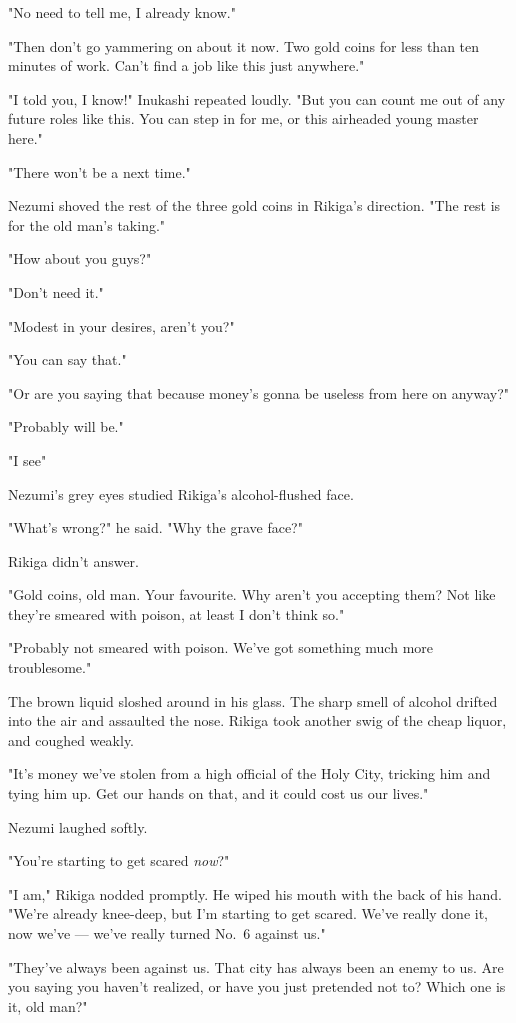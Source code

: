 "No need to tell me, I already know."

"Then don't go yammering on about it now. Two gold coins for less than
ten minutes of work. Can't find a job like this just anywhere."

"I told you, I know!" Inukashi repeated loudly. "But you can count me
out of any future roles like this. You can step in for me, or this
airheaded young master here."

"There won't be a next time."

Nezumi shoved the rest of the three gold coins in Rikiga's direction.
"The rest is for the old man's taking."

"How about you guys?"

"Don't need it."

"Modest in your desires, aren't you?"

"You can say that."

"Or are you saying that because money's gonna be useless from here on
anyway?"

"Probably will be."

"I see\el "

Nezumi's grey eyes studied Rikiga's alcohol-flushed face.

"What's wrong?" he said. "Why the grave face?"

Rikiga didn't answer.

"Gold coins, old man. Your favourite. Why aren't you accepting them? Not
like they're smeared with poison, at least I don't think so."

"Probably not smeared with poison. We've got something much more
troublesome."

The brown liquid sloshed around in his glass. The sharp smell of alcohol
drifted into the air and assaulted the nose. Rikiga took another swig of
the cheap liquor, and coughed weakly.

"It's money we've stolen from a high official of the Holy City, tricking
him and tying him up. Get our hands on that, and it could cost us our
lives."

Nezumi laughed softly.

"You're starting to get scared \emph{now}?"

"I am," Rikiga nodded promptly. He wiped his mouth with the back of his
hand. "We're already knee-deep, but I'm starting to get scared. We've
really done it, now we've --- we've really turned No.~6 against us."

"They've always been against us. That city has always been an enemy to
us. Are you saying you haven't realized, or have you just pretended not
to? Which one is it, old man?"


